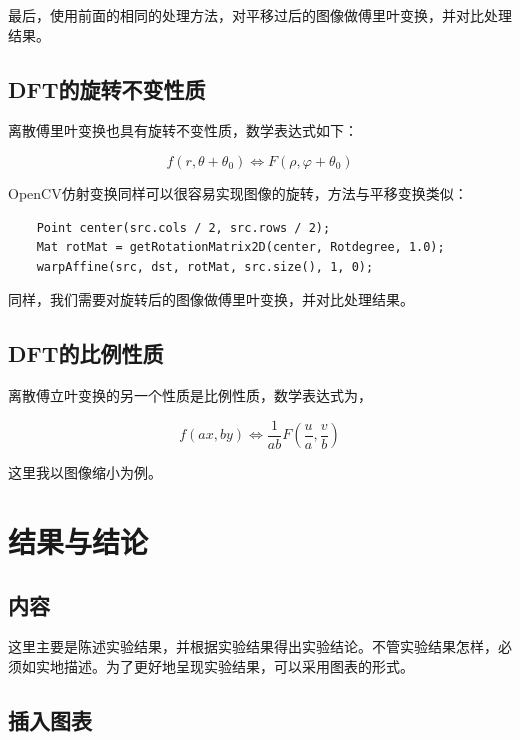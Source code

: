 \documentclass[hyperref,UTF8]{ctexart}
\begin{document}
最后，使用前面的相同的处理方法，对平移过后的图像做傅里叶变换，并对比处理结果。

\subsection{DFT的旋转不变性质}

离散傅里叶变换也具有旋转不变性质，数学表达式如下：

\begin{equation}
f(r,\theta + \theta_0) \Leftrightarrow F(\rho ,\varphi + \theta_0)
\end{equation}

OpenCV仿射变换同样可以很容易实现图像的旋转，方法与平移变换类似：

\begin{lstlisting}
	Point center(src.cols / 2, src.rows / 2);
	Mat rotMat = getRotationMatrix2D(center, Rotdegree, 1.0);
	warpAffine(src, dst, rotMat, src.size(), 1, 0);
\end{lstlisting}

同样，我们需要对旋转后的图像做傅里叶变换，并对比处理结果。

\subsection{DFT的比例性质}

离散傅立叶变换的另一个性质是比例性质，数学表达式为，

\begin{equation}
f(ax,by) \Leftrightarrow \frac{1}{ab}F(\frac{u}{a},\frac{v}{b})
\end{equation}

这里我以图像缩小为例。

\section{结果与结论}

\subsection{内容}

这里主要是陈述实验结果，并根据实验结果得出实验结论。不管实验结果怎样，必须如实地描述。为了更好地呈现实验结果，可以采用图表的形式。

\subsection{插入图表}
\end{document}
